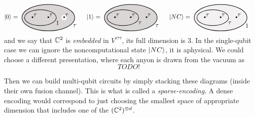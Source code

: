 \begin{equation*}
  \vert 0 \rangle =
\raisebox{-20pt}{
\begin{tikzpicture}[scale=1.5]
    \fill[gray!30] (3,0) ellipse (1 and 0.5);
    \draw[->, thick] (3,0) ellipse (1 and 0.5);
    \fill[white] (3.6,0) circle (0.1);
    \draw[->, thick] (2.7,0) ellipse (0.6 and 0.3);
    \node at (3.35,-0.2) {$1$};
    \node[scale=2.5] at (2.4, 0) {$\cdot$};
    \node at (2.5,0.1) {$\tau$};
    \node[scale=2.5] at (3.0, 0) {$\cdot$};
    \node at (3.1,0.1) {$\tau$};
    \node[scale=2.5] at (3.6, 0) {$\cdot$};
    \node at (3.7,0.1) {$\tau$};
    \node at (4.0,-0.3) {$\tau$};
\end{tikzpicture}
} 
\quad
\vert 1 \rangle = 
\raisebox{-20pt}{
\begin{tikzpicture}[scale=1.5]    
    \fill[gray!30] (3,0) ellipse (1 and 0.5);
    \draw[thick] (3,0) ellipse (1 and 0.5);
    
    \draw[thick] (2.7,0) ellipse (0.6 and 0.3);
    \node at (3.35,-0.2) {$\tau$};

    \node[scale=2.5] at (2.4, 0) {$\cdot$};
    \node at (2.5,0.1) {$\tau$};
    \node[scale=2.5] at (3.0, 0) {$\cdot$};
    \node at (3.1,0.1) {$\tau$};
    \node[scale=2.5] at (3.6, 0) {$\cdot$};
    \node at (3.7,0.1) {$\tau$};
    \node at (4.0,-0.3) {$\tau$};
\end{tikzpicture}
}
\quad 
\vert NC \rangle =
\raisebox{-20pt}{
\begin{tikzpicture}[scale=1.5]

    \fill[gray!10] (3,0) ellipse (1 and 0.5);
    \draw[thick] (3,0) ellipse (1 and 0.5);
    
    \draw[thick] (2.7,0) ellipse (0.6 and 0.3);
    \node at (3.35,-0.2) {$\tau$};
    \node[scale=2.5] at (2.4, 0) {$\cdot$};
    \node at (2.5, 0.1) {$\tau$};
    \node[scale=2.5] at (3.0, 0) {$\cdot$};
    \node at (3.1,0.1) {$\tau$};
    \node[scale=2.5] at (3.6, 0) {$\cdot$};
    \node at (3.7,0.1) {$\tau$};
    \node at (4.0,-0.3) {$1$};

\end{tikzpicture}
}
\end{equation*}
and we say that $\mathbb{C}^2$ is \emph{embedded} in $V^{\tau \tau \tau}$, its full
dimension is $3$. In the single-qubit case we can ignore the noncomputational
state $\left| NC \right\rangle$, it is aphysical. We could choose a different presentation,
where each anyon is drawn from the vacuum as
\[
  TODO!
\]

Then we can build multi-qubit circuits by simply stacking these diagrams (inside
their own fusion channel). This is what is called a \emph{sparse-encoding}. A
dense encoding would correspond to just choosing the smallest space of
appropriate dimension that includes one of the $(\mathbb{C}^2)^{\otimes d}$.

